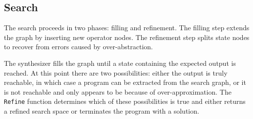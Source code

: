\documentclass[review]{acmart}
\begin{document}
\subsection{Search}

The search proceeds in two phases: filling and refinement. The filling step
extends the graph by inserting new operator nodes. The refinement step splits
state nodes to recover from errors caused by over-abstraction.

The synthesizer fills the graph until a state containing the expected output is
reached. At this point there are two possibilities: either the output is truly
reachable, in which case a program can be extracted from the search graph, or it
is not reachable and only appears to be because of over-approximation. The
\texttt{Refine} function determines which of these possibilities is true and
either returns a refined search space or terminates the program with a solution.
\end{document}
